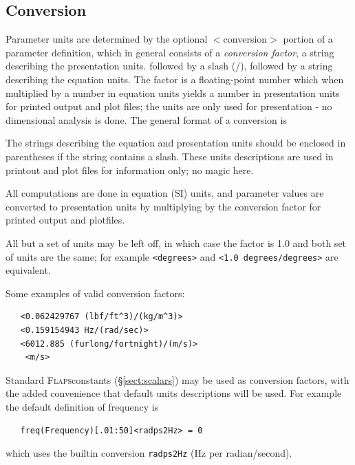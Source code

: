 \documentclass[11pt,openany,twoside]{book}
\numberwithin{equation}{section}		%
\newcommand{\Newterm}[1]{{\em #1}}
\newcommand{\Code}[1]{{\small\tt #1}}
\newcommand{\Subst}[1]{{\small\sf #1}}
\newcommand{\Flaps}{\textsc{Flaps\:}}
\newcommand{\Sectref}[1]{\S\ref{#1}}
\begin{document}
\subsection{Conversion}\label{sect:parunits}
Parameter units are determined by the optional
$<$\Subst{conversion}$>$\/ portion of a parameter
definition, which in general consists of a \Newterm{conversion factor},
a string describing the presentation units.
followed by a slash (/),
followed by a string describing the equation units.
The factor is a floating-point number which when multiplied by a number
in equation units yields a number in presentation units for
printed output and plot files; the units are
only used for presentation - no dimensional analysis is done.
The general format of a conversion is
\vspace{1.5ex}
\begin{center}
\fbox{$<$ \Subst{factor}\ (\Subst{presentation units})/(\Subst{equation units})$>$}
\end{center}
\vspace{1.5ex}
\par
The strings describing the equation and presentation units should be enclosed
in parentheses if the string contains a slash.
These units descriptions are used in printout and plot files
for information only; no magic here.
\par
All computations are done in equation (SI) units, and parameter
values are converted to presentation units by  multiplying by the
conversion factor for printed output and plotfiles.
\par
All but a set of units may be left off, in which case the factor is 1.0
and both set of units are the same; for example \Code{<degrees>} and
\Code{<1.0 degrees/degrees>} are equivalent.

Some examples of valid conversion factors:
\begin{lstlisting}
   <0.062429767 (lbf/ft^3)/(kg/m^3)>
   <0.159154943 Hz/(rad/sec)>
   <6012.885 (furlong/fortnight)/(m/s)>
	<m/s>
\end{lstlisting}
\par
Standard \Flaps constants (\Sectref{sect:scalars})
may be used as conversion factors, with the added convenience
that default units descriptions will be used. For example
the default definition of frequency is
\begin{lstlisting}
   freq(Frequency)[.01:50]<radps2Hz> = 0
\end{lstlisting}
which uses the builtin conversion \Code{radps2Hz} (Hz per radian/second).
\end{document}
